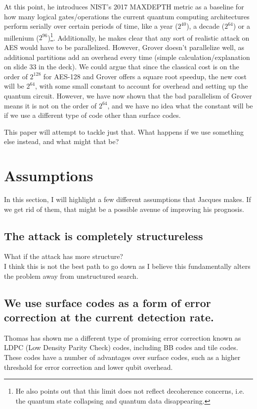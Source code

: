 At this point, he introduces NIST's 2017 MAXDEPTH metric as a baseline for how many logical gates/operations the current quantum computing architectures perform serially over certain periods of time, like a year ($2^{40}$), a decade ($2^{64}$) or a millenium ($2^96$)\footnote{He also points out that this limit does not reflect decoherence concerns, i.e. the quantum state collapsing and quantum data disappearing.}. Additionally, he makes clear that any sort of realistic attack on AES would have to be parallelized. However, Grover doesn't parallelize well, as additional partitions add an overhead every time (simple calculation/explanation on slide 33 in the deck). We could argue that since the classical cost is on the order of $2^{128}$ for AES-128 and Grover offers a square root speedup, the new cost will be $2^{64}$, with some small constant to account for overhead and setting up the quantum circuit. However, we have now shown that the bad parallelism of Grover means it is not on the order of $2^{64}$, and we have no idea what the constant will be if we use a different type of code other than surface codes.

This paper will attempt to tackle just that. What happens if we use something else instead, and what might that be?

\section{Assumptions}
In this section, I will highlight a few different assumptions that Jacques makes. If we get rid of them, that might be a possible avenue of improving his prognosis.

\subsection{The attack is completely structureless}
What if the attack has more structure?\\
I think this is not the best path to go down as I believe this fundamentally alters the problem away from unstructured search.

\subsection{We use surface codes as a form of error correction at the current detection rate.}
Thomas has shown me a different type of promising error correction known as LDPC (Low Density Parity Check) codes, including BB codes and tile codes. These codes have a number of advantages over surface codes, such as a higher threshold for error correction and lower qubit overhead.\\

